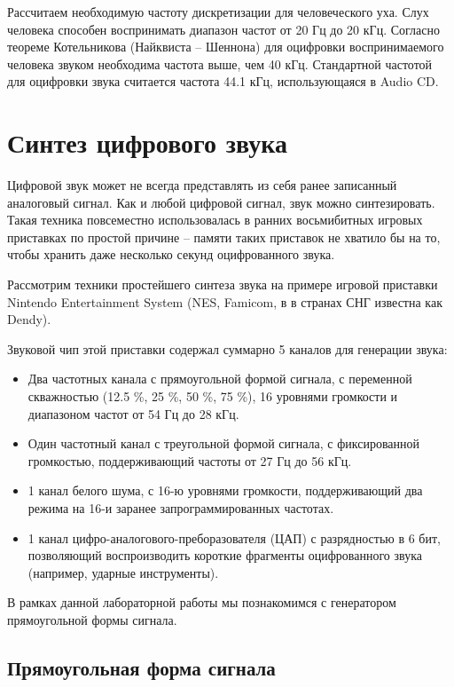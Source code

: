 Рассчитаем необходимую частоту дискретизации для человеческого уха.
Слух человека способен воспринимать диапазон частот от 20 Гц до 20 кГц.
Согласно теореме Котельникова (Найквиста -- Шеннона) для оцифровки воспринимаемого человека звуком необходима частота выше, чем 40 кГц. Стандартной частотой для оцифровки звука считается частота 44.1 кГц, использующаяся в Audio CD.


\section{Синтез цифрового звука}

Цифровой звук может не всегда представлять из себя ранее записанный аналоговый сигнал.
Как и любой цифровой сигнал, звук можно синтезировать.
Такая техника повсеместно использовалась в ранних восьмибитных игровых приставках по простой причине -- памяти таких приставок не хватило бы на то, чтобы хранить даже несколько секунд оцифрованного звука.

Рассмотрим техники простейшего синтеза звука на примере игровой приставки Nintendo Entertainment System (NES, Famicom, в в странах СНГ известна как Dendy).

Звуковой чип этой приставки содержал суммарно 5 каналов для генерации звука:

\begin{itemize}
	\item Два частотных канала с прямоугольной формой сигнала, с переменной скважностью (12.5 \%, 25 \%, 50 \%, 75 \%), 16 уровнями громкости и диапазоном частот от 54 Гц до 28 кГц.
	\item Один частотный канал с треугольной формой сигнала, с фиксированной громкостью, поддерживающий частоты от 27 Гц до 56 кГц.
	\item 1 канал белого шума, с 16-ю уровнями громкости, поддерживающий два режима на 16-и заранее запрограммированных частотах. 
	\item 1 канал цифро-аналогового-преборазователя (ЦАП) с разрядностью в 6 бит, позволяющий воспроизводить короткие фрагменты оцифрованного звука (например, ударные инструменты).

\end{itemize}

В рамках данной лабораторной работы мы познакомимся с генератором прямоугольной формы сигнала.

\subsection{Прямоугольная форма сигнала}

